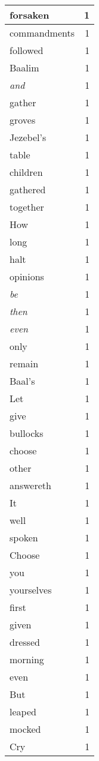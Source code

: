 \begin{center}
\begin{longtable}{l|r}
forsaken & 1\\ \hline 
commandments & 1\\ \hline 
followed & 1\\ \hline 
Baalim & 1\\ \hline 
\emph{and} & 1\\ \hline 
gather & 1\\ \hline 
groves & 1\\ \hline 
Jezebel's & 1\\ \hline 
table & 1\\ \hline 
children & 1\\ \hline 
gathered & 1\\ \hline 
together & 1\\ \hline 
How & 1\\ \hline 
long & 1\\ \hline 
halt & 1\\ \hline 
opinions & 1\\ \hline 
\emph{be} & 1\\ \hline 
\emph{then} & 1\\ \hline 
\emph{even} & 1\\ \hline 
only & 1\\ \hline 
remain & 1\\ \hline 
Baal's & 1\\ \hline 
Let & 1\\ \hline 
give & 1\\ \hline 
bullocks & 1\\ \hline 
choose & 1\\ \hline 
other & 1\\ \hline 
answereth & 1\\ \hline 
It & 1\\ \hline 
well & 1\\ \hline 
spoken & 1\\ \hline 
Choose & 1\\ \hline 
you & 1\\ \hline 
yourselves & 1\\ \hline 
first & 1\\ \hline 
given & 1\\ \hline 
dressed & 1\\ \hline 
morning & 1\\ \hline 
even & 1\\ \hline 
But & 1\\ \hline 
leaped & 1\\ \hline 
mocked & 1\\ \hline 
Cry & 1\\ \hline 

\end{longtable}
\end{center}
